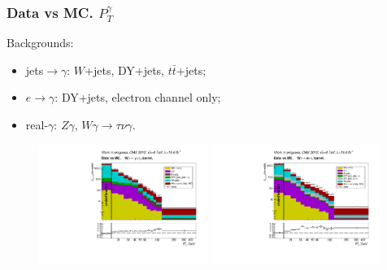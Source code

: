 \begin{frame}\frametitle{Data vs MC. $P_T^{\gamma}$}
\scriptsize
Backgrounds:
\begin{itemize}
   \item jets$\rightarrow\gamma$: $W$+jets, DY+jets, $t\bar{t}$+jets;
   \item $e\rightarrow\gamma$: DY+jets, electron channel only;
   \item real-$\gamma$: $Z\gamma$, $W\gamma\rightarrow\tau\nu\gamma$.
\end{itemize}
  \begin{figure}[htb]
    \begin{center}
       \includegraphics[width=0.49\textwidth]{../figs/figs_v11/MUON_WGamma/PrepareYields/c_TotalDATAvsMC_Barrel__phoEt.pdf} \includegraphics[width=0.49\textwidth]{../figs/figs_v11/ELECTRON_WGamma/PrepareYields/c_TotalDATAvsMC_Barrel__phoEt.pdf} 
    \end{center}
  \end{figure}
\end{frame}
